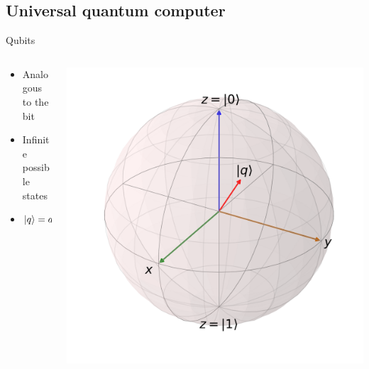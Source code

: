 \documentclass[14pt]{beamer}
\let\olditem\item
\renewcommand{\item}{%
\olditem\vspace{10pt}}
\begin{document}
\subsection{Universal quantum computer}
\begin{frame}{Qubits}
\begin{columns}[T]
	\begin{column}{.5\textwidth}
		\begin{block}{}
			\begin{itemize}
				\item Analogous to the bit
				\item Infinite possible states
				\item $\ket{q} = a_0 \ket{0} + a_1 \ket{1}$
			\end{itemize}
    	\end{block}
	\end{column}
	\begin{column}{.5\textwidth}
    	\begin{block}{}
		\includegraphics[width=1\textwidth]{../resources/pdfs/custom_Bloch_sphere.pdf}
	\end{block}
	\end{column}
\end{columns}
\end{frame}
\end{document}
